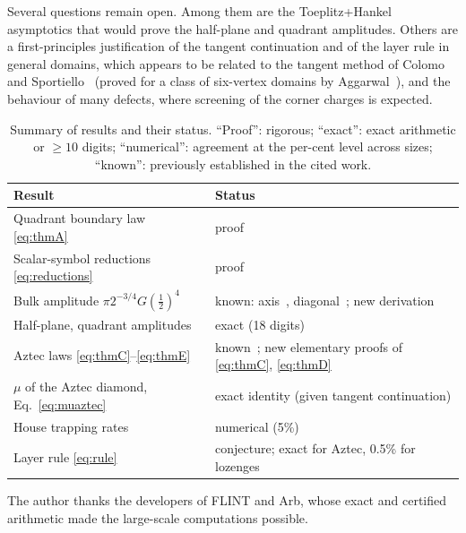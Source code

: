 \documentclass[aps,pre,twocolumn,superscriptaddress,nofootinbib,floatfix]{revtex4-2}
\begin{document}
Several questions remain open. Among them are the Toeplitz+Hankel asymptotics that would prove the half-plane and quadrant amplitudes. Others are a first-principles justification of the tangent continuation and of the layer rule in general domains, which appears to be related to the tangent method of Colomo and Sportiello~\cite{ColomoSportiello2016} (proved for a class of six-vertex domains by Aggarwal~\cite{Aggarwal2020}), and the behaviour of many defects, where screening of the corner charges is expected.

\begin{table}[t]
\caption{Summary of results and their status. ``Proof'': rigorous; ``exact'': exact arithmetic or $\geq10$ digits; ``numerical'': agreement at the per-cent level across sizes; ``known'': previously established in the cited work.}
\label{tab:summary}
\begin{ruledtabular}
\begin{tabular}{p{4.6cm}p{3.0cm}}
Result & Status\\
\hline
Quadrant boundary law \eqref{eq:thmA} & proof\\
Scalar-symbol reductions \eqref{eq:reductions} & proof\\
Bulk amplitude $\pi2^{-3/4}G(\frac12)^4$ & known: axis~\cite{WilkinsPowell2021}, diagonal~\cite{Hartwig1966}; new derivation\\
Half-plane, quadrant amplitudes & exact (18 digits)\\
Aztec laws \eqref{eq:thmC}--\eqref{eq:thmE} & known~\cite{ChhitaYoung2014}; new elementary proofs of \eqref{eq:thmC}, \eqref{eq:thmD}\\
$\mu$ of the Aztec diamond, Eq.~\eqref{eq:muaztec} & exact identity (given tangent continuation)\\
House trapping rates & numerical (5\%)\\
Layer rule \eqref{eq:rule} & conjecture; exact for Aztec, 0.5\% for lozenges\\
\end{tabular}
\end{ruledtabular}
\end{table}

\begin{acknowledgments}
The author thanks the developers of FLINT and Arb, whose exact and certified arithmetic made the large-scale computations possible.
\end{acknowledgments}

\appendix
\end{document}
